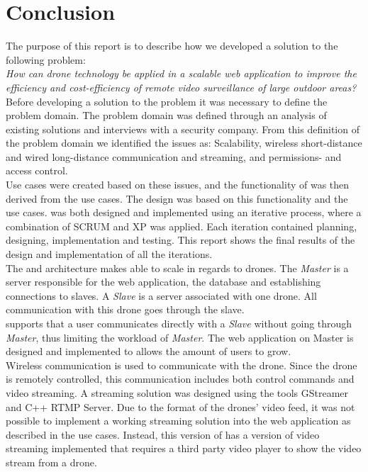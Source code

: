 
\section{Conclusion}
The purpose of this report is to describe how we developed a solution to the following problem: \\

\textit{How can drone technology be applied in a scalable web application to improve the efficiency and cost-efficiency of remote video surveillance of large outdoor areas?} \\

Before developing a solution to the problem it was necessary to define the problem domain.
The problem domain was defined through an analysis of existing solutions and interviews with a security company.
From this definition of the problem domain we identified the issues as: Scalability, wireless short-distance and wired long-distance communication and streaming, and permissions- and access control. \\

Use cases were created based on these issues, and the functionality of \projectname{} was then derived from the use cases. 
The design was based on this functionality and the use cases.
\projectname{} was both designed and implemented using an iterative process, where a combination of SCRUM and XP was applied. 
Each iteration contained planning, designing, implementation and testing. 
This report shows the final results of the design and implementation of all the iterations. \\

The  and  architecture makes \projectname{} able to scale in regards to drones. 
The \emph{Master} is a server responsible for the web application, the database and establishing connections to slaves.
A \emph{Slave} is a server associated with one drone. 
All communication with this drone goes through the slave. \\

\projectname{} supports that a user communicates directly with a \emph{Slave} without going through \emph{Master}, thus limiting the workload of \emph{Master}. 
The web application on Master is designed and implemented to allows the amount of users to grow. \\

Wireless communication is used to communicate with the drone. 
Since the drone is remotely controlled, this communication includes both control commands and video streaming.
A streaming solution was designed using the tools GStreamer and C++ RTMP Server.
Due to the format of the drones' video feed, it was not possible to implement a working streaming solution into the web application as described in the use cases.
Instead, this version of \projectname{} has a version of video streaming implemented that requires a third party video player to show the video stream from a drone. \\

